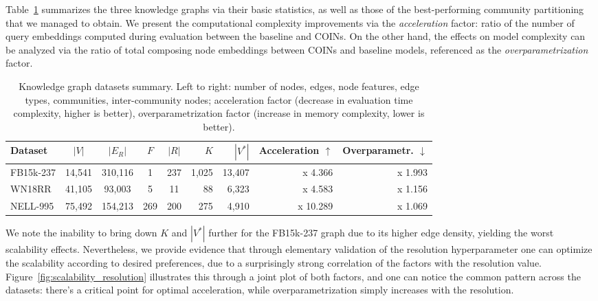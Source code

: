 Table~\ref{tab:datasets} summarizes the three knowledge graphs via their basic statistics, as well as those of the best-performing community partitioning that we managed to obtain. We present the computational complexity improvements via the \emph{acceleration} factor: ratio of the number of query embeddings computed during evaluation between the baseline and COINs. On the other hand, the effects on model complexity can be analyzed via the ratio of total composing node embeddings between COINs and baseline models, referenced as the \emph{overparametrization} factor. 

\begin{table}[H]
  \caption[Knowledge graph datasets summary.]{Knowledge graph datasets summary. Left to right: number of nodes, edges, node features, edge types, communities, inter-community nodes; acceleration factor (decrease in evaluation time complexity, higher is better), overparametrization factor (increase in memory complexity, lower is better).}
  \label{tab:datasets}
  \centering
  \begin{adjustbox}{width=\textwidth}
  \begin{tabular}{lccccrrrr}
    \toprule
    Dataset & $|V|$ & $|E_R|$ & $F$ & $|R|$ & $K$ & $|V^*|$ & Acceleration $\uparrow$ & Overparametr. $\downarrow$ \\ %
    \midrule
    FB15k-237 & 14,541 & 310,116 & 1 & 237 & 1,025 & 13,407 & x 4.366 & x 1.993 \\
    WN18RR & 41,105 & 93,003 & 5 & 11 & 88 & 6,323 & x 4.583 & x 1.156 \\
    NELL-995 & 75,492 & 154,213 & 269 & 200 & 275 & 4,910 & x 10.289 & x 1.069 \\
    \bottomrule
  \end{tabular}
  \end{adjustbox}
\end{table}

We note the inability to bring down $K$ and $|V^*|$ further for the FB15k-237 graph due to its higher edge density, yielding the worst scalability effects. Nevertheless, we provide evidence that through elementary validation of the resolution hyperparameter one can optimize the scalability according to desired preferences, due to a surprisingly strong correlation of the factors with the resolution value. Figure~\ref{fig:scalability_resolution} illustrates this through a joint plot of both factors, and one can notice the common pattern across the datasets: there's a critical point for optimal acceleration, while overparametrization simply increases with the resolution.

